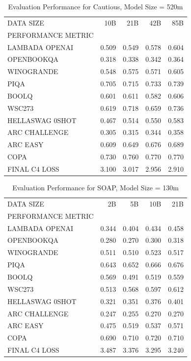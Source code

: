 \begin{table}
[H] \centering \caption{Evaluation Performance for Cautious, Model Size = 520m}
\label{tab:eval-performance-cautious-520M}
\begin{tabular}{lrrrr}
\toprule
DATA SIZE & 10B & 21B & 42B & 85B \\
PERFORMANCE METRIC &  &  &  &  \\
\midrule
LAMBADA OPENAI & 0.509 & 0.549 & 0.578 & 0.604 \\
OPENBOOKQA & 0.318 & 0.338 & 0.342 & 0.364 \\
WINOGRANDE & 0.548 & 0.575 & 0.571 & 0.605 \\
PIQA & 0.705 & 0.715 & 0.733 & 0.739 \\
BOOLQ & 0.601 & 0.611 & 0.582 & 0.606 \\
WSC273 & 0.619 & 0.718 & 0.659 & 0.736 \\
HELLASWAG 0SHOT & 0.467 & 0.514 & 0.550 & 0.583 \\
ARC CHALLENGE & 0.305 & 0.315 & 0.344 & 0.358 \\
ARC EASY & 0.609 & 0.649 & 0.676 & 0.689 \\
COPA & 0.730 & 0.760 & 0.770 & 0.770 \\
FINAL C4 LOSS & 3.100 & 3.017 & 2.956 & 2.910 \\
\bottomrule
\end{tabular}
\end{table}


\begin{table}
[H] \centering \caption{Evaluation Performance for SOAP, Model Size = 130m}
\label{tab:eval-performance-soap-130M}
\begin{tabular}{lrrrr}
\toprule
DATA SIZE & 2B & 5B & 10B & 21B \\
PERFORMANCE METRIC &  &  &  &  \\
\midrule
LAMBADA OPENAI & 0.344 & 0.404 & 0.434 & 0.458 \\
OPENBOOKQA & 0.280 & 0.270 & 0.300 & 0.318 \\
WINOGRANDE & 0.511 & 0.510 & 0.523 & 0.517 \\
PIQA & 0.643 & 0.652 & 0.666 & 0.676 \\
BOOLQ & 0.569 & 0.491 & 0.519 & 0.559 \\
WSC273 & 0.513 & 0.568 & 0.597 & 0.612 \\
HELLASWAG 0SHOT & 0.321 & 0.351 & 0.376 & 0.401 \\
ARC CHALLENGE & 0.247 & 0.255 & 0.270 & 0.270 \\
ARC EASY & 0.475 & 0.519 & 0.537 & 0.571 \\
COPA & 0.690 & 0.710 & 0.720 & 0.710 \\
FINAL C4 LOSS & 3.487 & 3.376 & 3.295 & 3.240 \\
\bottomrule
\end{tabular}
\end{table}


